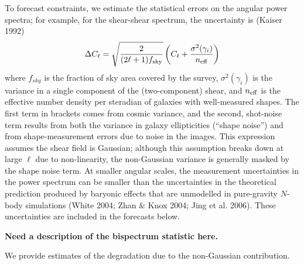 \documentclass[preprint]{aastex}
\begin{document}
To forecast constraints, we estimate the statistical errors on the
angular power spectra; for example, for the shear-shear spectrum,
the uncertainty is (Kaiser 1992)
\begin{equation}
\Delta C_\ell = \sqrt{\frac{2}{(2\ell+1)f_{\rm sky}} }
\left( C_\ell +\frac{\sigma^2(\gamma_i)}{n_{\rm eff}} \right)
\label{eqn:power_error}
\end{equation}
%
where $f_{sky}$ is the fraction of sky area covered by the survey,
$\sigma^2(\gamma_i)$ is the variance in a single component of the
(two-component) shear, and $n_{\rm eff}$ is the effective number
density per steradian of galaxies with well-measured shapes. The first
term in brackets comes from cosmic 
variance, and the second, shot-noise term results from both the
variance in galaxy ellipticities (``shape noise'') and from
shape-measurement errors due to noise in the images. This expression
assumes the shear field is 
Gaussian; although this assumption breaks down at large $\ell$ due
to non-linearity, the non-Gaussian variance is generally masked by
the shape noise term.  At smaller angular scales, the measurement
uncertainties in the power spectrum can be smaller than the
uncertainties in the theoretical prediction produced by baryonic
effects that are unmodelled in pure-gravity $N$-body simulations
(White 2004; Zhan \& Knox 2004; Jing et al. 2006).  These
uncertainties are included in the forecasts below.

{\bf Need a description of the bispectrum statistic here.}

We provide estimates of the degradation due to
the non-Gaussian contribution. 

\end{document}
